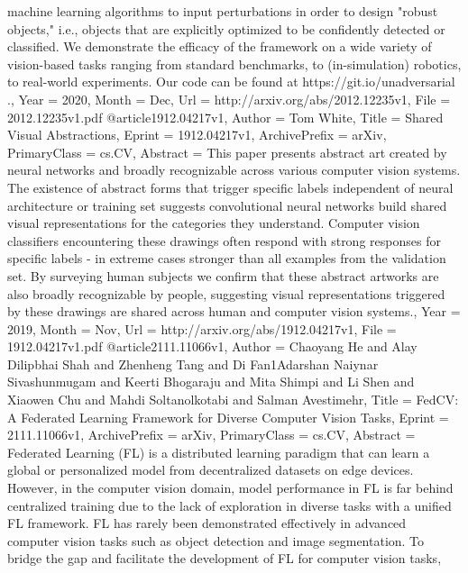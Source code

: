 {{{machine learning algorithms to input perturbations in order to design "robust
objects," i.e., objects that are explicitly optimized to be confidently
detected or classified. We demonstrate the efficacy of the framework on a wide
variety of vision-based tasks ranging from standard benchmarks, to
(in-simulation) robotics, to real-world experiments. Our code can be found at
https://git.io/unadversarial .},
Year          = {2020},
Month         = {Dec},
Url           = {http://arxiv.org/abs/2012.12235v1},
File          = {2012.12235v1.pdf}
}
@article{1912.04217v1,
Author        = {Tom White},
Title         = {Shared Visual Abstractions},
Eprint        = {1912.04217v1},
ArchivePrefix = {arXiv},
PrimaryClass  = {cs.CV},
Abstract      = {This paper presents abstract art created by neural networks and broadly
recognizable across various computer vision systems. The existence of abstract
forms that trigger specific labels independent of neural architecture or
training set suggests convolutional neural networks build shared visual
representations for the categories they understand. Computer vision classifiers
encountering these drawings often respond with strong responses for specific
labels - in extreme cases stronger than all examples from the validation set.
By surveying human subjects we confirm that these abstract artworks are also
broadly recognizable by people, suggesting visual representations triggered by
these drawings are shared across human and computer vision systems.},
Year          = {2019},
Month         = {Nov},
Url           = {http://arxiv.org/abs/1912.04217v1},
File          = {1912.04217v1.pdf}
}
@article{2111.11066v1,
Author        = {Chaoyang He and Alay Dilipbhai Shah and Zhenheng Tang and Di Fan1Adarshan Naiynar Sivashunmugam and Keerti Bhogaraju and Mita Shimpi and Li Shen and Xiaowen Chu and Mahdi Soltanolkotabi and Salman Avestimehr},
Title         = {FedCV: A Federated Learning Framework for Diverse Computer Vision Tasks},
Eprint        = {2111.11066v1},
ArchivePrefix = {arXiv},
PrimaryClass  = {cs.CV},
Abstract      = {Federated Learning (FL) is a distributed learning paradigm that can learn a
global or personalized model from decentralized datasets on edge devices.
However, in the computer vision domain, model performance in FL is far behind
centralized training due to the lack of exploration in diverse tasks with a
unified FL framework. FL has rarely been demonstrated effectively in advanced
computer vision tasks such as object detection and image segmentation. To
bridge the gap and facilitate the development of FL for computer vision tasks,
}}}
